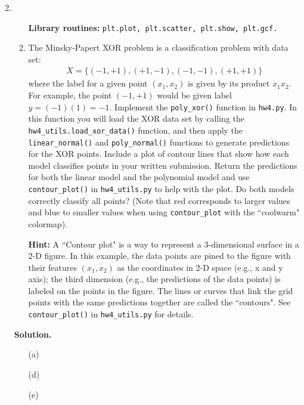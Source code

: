 \documentclass{article}
\theoremstyle{definition}
\theoremstyle{remark}
\newenvironment{Q}
{%
  \clearpage
  \item
  }
  {%
    \phantom{s} %
    \bigskip
    \textbf{Solution.}
  }
\begin{document}
\begin{enumerate}[font={\Large\bfseries},left=0pt]
\begin{Q}
\begin{enumerate}
  \textbf{Library routines:} \texttt{plt.plot, plt.scatter, plt.show, plt.gcf.}
  
  \item The Minsky-Papert XOR problem is a classification problem with data set: \begin{align*}
  X = \{(-1,+1), (+1,-1), (-1,-1),(+1,+1)\}
\end{align*}
where the label for a given point $(x_1,x_2)$ is given by its product $x_1x_2$.  For example, the point $(-1,+1)$ would be given label $y = (-1)(1) = -1$.  Implement the \texttt{poly\_xor()} function in \texttt{hw4.py}.  In this function you will load the XOR data set by calling the \texttt{hw4\_utils.load\_xor\_data()} function, and then apply the \texttt{linear\_normal()} and \texttt{poly\_normal()} functions to generate predictions for the XOR points. Include a plot of contour lines that show how each model classifies points in your written submission. Return the predictions for both the linear model and the polynomial model and use \texttt{contour\_plot()} in \texttt{hw4\_utils.py} to help with the plot. Do both models correctly classify all points? (Note that red corresponds to larger values and blue to smaller values when using \texttt{contour\_plot} with the ``coolwarm" colormap).

\textbf{Hint:} A ``Contour plot" is a way to represent a 3-dimensional surface in a 2-D figure. In this example, the data points are pined to the figure with their features $(x_1, x_2)$ as the coordinates in 2-D space (e.g., x and y axis); the third dimension (e.g., the predictions of the data points) is labeled on the points in the figure. The lines or curves that link the grid points with the same predictions together are called the ``contours". See \texttt{contour\_plot()} in \texttt{hw4\_utils.py} for details.
  \end{enumerate}
  \end{Q}
  \begin{enumerate}
    \item[(a)]
    \item[(d)]
    \item[(e)]
  \end{enumerate}

\end{enumerate}
\end{document}
